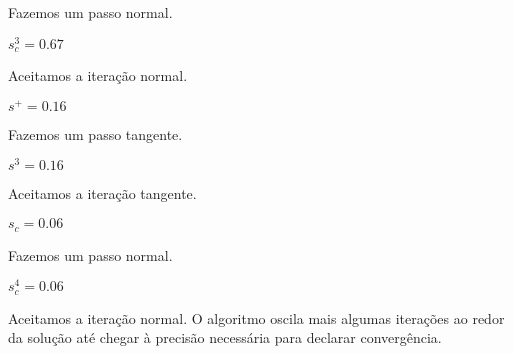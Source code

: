 \begin{center}
  \begin{minipage}{0.9\textwidth}
    Fazemos um passo normal.
  \end{minipage}
\end{center}

\begin{center}

  $s_c^3 = 0.67$
\end{center}

\begin{center}
  \begin{minipage}{0.9\textwidth}
    Aceitamos a iteração normal.
  \end{minipage}
\end{center}

\begin{center}

  $s^+ = 0.16$
\end{center}

\begin{center}
  \begin{minipage}{0.9\textwidth}
    Fazemos um passo tangente.
  \end{minipage}
\end{center}

\begin{center}

  $s^3 = 0.16$
\end{center}

\begin{center}
  \begin{minipage}{0.9\textwidth}
    Aceitamos a iteração tangente.
  \end{minipage}
\end{center}

\begin{center}

  $s_c = 0.06$
\end{center}

\begin{center}
  \begin{minipage}{0.9\textwidth}
    Fazemos um passo normal.
  \end{minipage}
\end{center}

\begin{center}

  $s_c^4 = 0.06$
\end{center}

\begin{center}
  \begin{minipage}{0.9\textwidth}
    Aceitamos a iteração normal. O algoritmo oscila mais algumas iterações ao
    redor da solução até chegar à precisão necessária para declarar
    convergência.
  \end{minipage}
\end{center}

